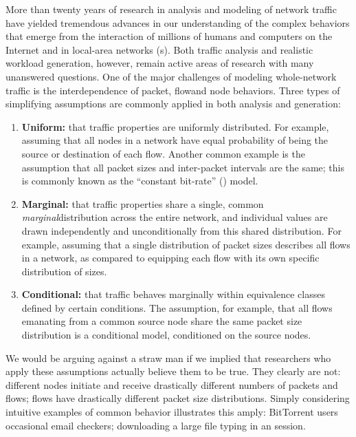\documentclass[twocolumn,final]{svjour3}
\begin{document}
More than twenty years of research in analysis and modeling of network traffic have yielded tremendous advances in our understanding of the complex behaviors that emerge from the interaction of millions of humans and computers on the Internet and in local-area networks (s).
Both traffic analysis and realistic workload generation, however, remain active areas of research with many unanswered questions.
One of the major challenges of modeling whole-network traffic is the interdependence of packet, flow\flownote and node behaviors.
Three types of simplifying assumptions are commonly applied in both analysis and generation:
\begin{enumerate}
\item \textbf{Uniform:} that traffic properties are uniformly distributed. For example, assuming that  all nodes in a network have equal probability of being the source or destination of each flow.
Another common example is the assumption that all packet sizes and inter-packet intervals are the same; this is commonly known as the ``constant bit-rate'' () model.
\item \textbf{Marginal:} that traffic properties share a single, common \emph{marginal}\marginalnote distribution across the entire network, and individual values are drawn independently and unconditionally from this shared distribution.
For example, assuming that a single distribution of packet sizes describes all flows in a network, as compared to equipping each flow with its own specific distribution of sizes.
\item \textbf{Conditional:} that traffic behaves marginally within equivalence classes defined by certain conditions.
The assumption, for example, that all flows emanating from a common source node share the same packet size distribution is a conditional model, conditioned on the source nodes.
\end{enumerate}
We would be arguing against a straw man if we implied that researchers who apply these assumptions actually believe them to be true.
They clearly are not:
different nodes initiate and receive drastically different numbers of packets and flows;
flows have drastically different packet size distributions.
Simply considering intuitive examples of common behavior illustrates this amply:
BitTorrent users  occasional email checkers;
downloading a large file  typing in an  session.

\end{document}
